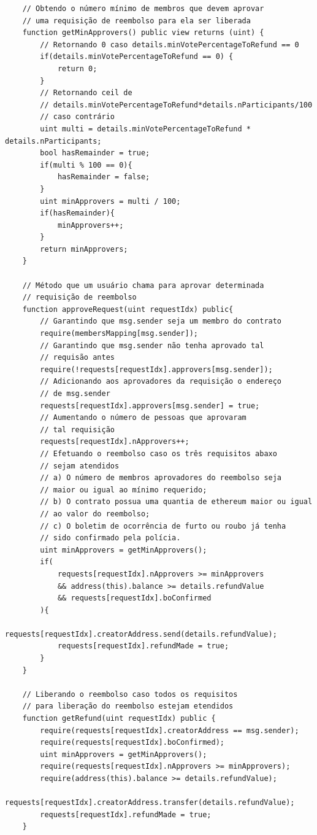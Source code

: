 \begin{code}
\begin{verbatim}
    // Obtendo o número mínimo de membros que devem aprovar
    // uma requisição de reembolso para ela ser liberada
    function getMinApprovers() public view returns (uint) {
        // Retornando 0 caso details.minVotePercentageToRefund == 0
        if(details.minVotePercentageToRefund == 0) {
            return 0;
        }
        // Retornando ceil de
        // details.minVotePercentageToRefund*details.nParticipants/100
        // caso contrário
        uint multi = details.minVotePercentageToRefund * details.nParticipants;
        bool hasRemainder = true;
        if(multi % 100 == 0){
            hasRemainder = false;
        }
        uint minApprovers = multi / 100;
        if(hasRemainder){
            minApprovers++;
        }
        return minApprovers;
    }

    // Método que um usuário chama para aprovar determinada
    // requisição de reembolso
    function approveRequest(uint requestIdx) public{
        // Garantindo que msg.sender seja um membro do contrato
        require(membersMapping[msg.sender]);
        // Garantindo que msg.sender não tenha aprovado tal
        // requisão antes
        require(!requests[requestIdx].approvers[msg.sender]);
        // Adicionando aos aprovadores da requisição o endereço
        // de msg.sender
        requests[requestIdx].approvers[msg.sender] = true;
        // Aumentando o número de pessoas que aprovaram
        // tal requisição
        requests[requestIdx].nApprovers++;
        // Efetuando o reembolso caso os três requisitos abaxo
        // sejam atendidos
        // a) O número de membros aprovadores do reembolso seja 
        // maior ou igual ao mínimo requerido;
        // b) O contrato possua uma quantia de ethereum maior ou igual
        // ao valor do reembolso;
        // c) O boletim de ocorrência de furto ou roubo já tenha
        // sido confirmado pela polícia.
        uint minApprovers = getMinApprovers();
        if(
            requests[requestIdx].nApprovers >= minApprovers
            && address(this).balance >= details.refundValue
            && requests[requestIdx].boConfirmed
        ){
            requests[requestIdx].creatorAddress.send(details.refundValue);
            requests[requestIdx].refundMade = true;
        }
    }

    // Liberando o reembolso caso todos os requisitos
    // para liberação do reembolso estejam etendidos
    function getRefund(uint requestIdx) public {
        require(requests[requestIdx].creatorAddress == msg.sender);
        require(requests[requestIdx].boConfirmed);
        uint minApprovers = getMinApprovers();
        require(requests[requestIdx].nApprovers >= minApprovers);
        require(address(this).balance >= details.refundValue);
        requests[requestIdx].creatorAddress.transfer(details.refundValue);
        requests[requestIdx].refundMade = true;
    }


\end{verbatim}
\end{code}
